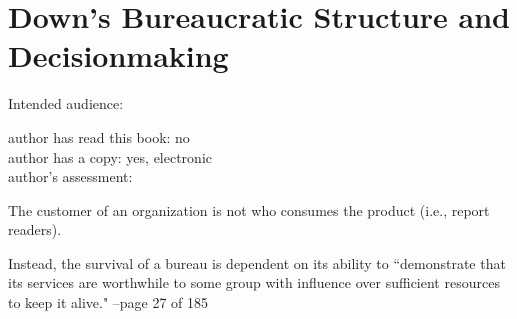 \section{Down's Bureaucratic Structure and Decisionmaking}

\cite{1966_Downs}

Intended audience:

author has read this book: no\\
author has a copy: yes, electronic\\
author's assessment:

The customer of an organization is not who consumes the product (i.e., report readers).

Instead, the survival of a bureau is dependent on its ability to ``demonstrate that its services are worthwhile to some group with influence over sufficient resources to keep it alive."
--page 27 of 185
